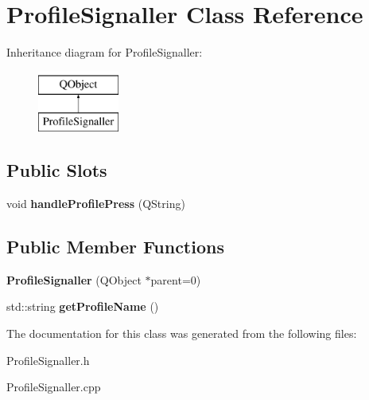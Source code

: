 \hypertarget{class_profile_signaller}{\section{Profile\+Signaller Class Reference}
\label{class_profile_signaller}
}
Inheritance diagram for Profile\+Signaller\+:\begin{figure}[H]
\begin{center}
\leavevmode
\includegraphics[height=2.000000cm]{class_profile_signaller}
\end{center}
\end{figure}
\subsection*{Public Slots}
\begin{DoxyCompactItemize}
\item 
\hypertarget{class_profile_signaller_a8e4416a01b54b90ebd7dcf749af7df33}{void {\bfseries handle\+Profile\+Press} (Q\+String)}\label{class_profile_signaller_a8e4416a01b54b90ebd7dcf749af7df33}

\end{DoxyCompactItemize}
\subsection*{Public Member Functions}
\begin{DoxyCompactItemize}
\item 
\hypertarget{class_profile_signaller_ae062c8a3a74c6db214aef6bbe4047781}{{\bfseries Profile\+Signaller} (Q\+Object $\ast$parent=0)}\label{class_profile_signaller_ae062c8a3a74c6db214aef6bbe4047781}

\item 
\hypertarget{class_profile_signaller_aca2c0e1b5eb9488544fa2a9e9a1dd411}{std\+::string {\bfseries get\+Profile\+Name} ()}\label{class_profile_signaller_aca2c0e1b5eb9488544fa2a9e9a1dd411}

\end{DoxyCompactItemize}


The documentation for this class was generated from the following files\+:\begin{DoxyCompactItemize}
\item 
Profile\+Signaller.\+h\item 
Profile\+Signaller.\+cpp\end{DoxyCompactItemize}
